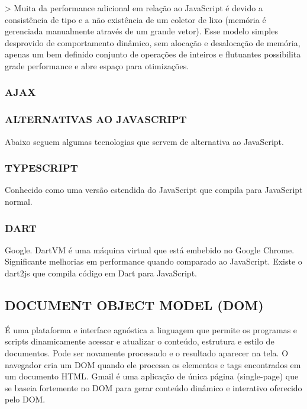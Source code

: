 \documentclass[11pt,a4paper]{article}
\begin{document}
> Muita da performance adicional em relação ao JavaScript é devido
a consistência de tipo e a não existência de um coletor de lixo
(memória é gerenciada manualmente através de um grande vetor). Esse
modelo simples desprovido de comportamento dinâmico, sem alocação
e desalocação de memória, apenas um bem definido conjunto de
operações de inteiros e flutuantes possibilita grade performance e
abre espaço para otimizações.

\subsubsection{AJAX}

\subsubsection{ ALTERNATIVAS AO JAVASCRIPT}

Abaixo seguem algumas tecnologias que servem de alternativa ao
JavaScript.

\subsubsection{TYPESCRIPT}

Conhecido como uma versão estendida do JavaScript que compila para
JavaScript normal.

\subsubsection{DART}

Google. DartVM é uma máquina virtual que está embebido no Google
Chrome. Significante melhorias em performance quando comparado
ao JavaScript. Existe o dart2js que compila código em Dart para
JavaScript.


\subsection{ DOCUMENT OBJECT MODEL (DOM)}

É uma plataforma e interface agnóstica a linguagem que permite os
programas e scripts dinamicamente acessar e atualizar o conteúdo,
estrutura e estilo de documentos. Pode ser novamente processado e o
resultado aparecer na tela. O navegador cria um DOM quando ele processa
os elementos e tags encontrados em um documento HTML. Gmail é uma
aplicação de única página (single-page) que se baseia fortemente no
DOM para gerar conteúdo dinâmico e interativo oferecido pelo DOM.
\end{document}
